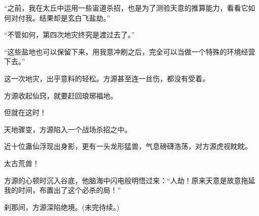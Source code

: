 \begin{this_body}
“之前，我在太丘中运用一些宙道杀招，也是为了测验天意的推算能力，看看它如何对付我。结果却是玄白飞盐劫。”

“不管如何，第四次地灾终究是渡过去了。”

“这些盐地也可以保留下来，用我意冲刷之后，完全可以当做一个特殊的环境经营下去。”

这一次地灾，出乎意料的轻松。方源甚至连一丝伤，都没有受着。

方源收起仙窍，就要赶回琅琊福地。

但就在这时！

天地骤变，方源陷入一个战场杀招之中。

近十位蛊仙浮现出身影，更有一头龙形猛兽，气息磅礴浩荡，对方源虎视眈眈。

太古荒兽！

方源的心顿时沉入谷底，他脑海中闪电般明悟过来：“人劫！原来天意是故意拖延我的时间，布置出了这个必杀的局！”

刹那间，方源深陷绝境。(未完待续。)

\end{this_body}

